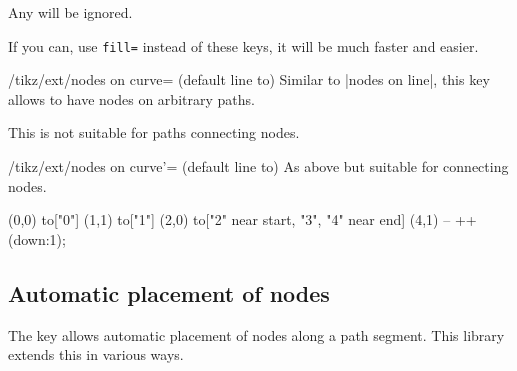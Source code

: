 \begin{multicols}{2}
Any  will be ignored.

If you can, use \texttt{fill=}
instead of these keys, it will be much faster and easier.

\begin{stylekey}{/tikz/ext/nodes on curve= (default line to)}
Similar to |nodes on line|, this key allows
to have nodes on arbitrary paths.

This is not suitable for paths connecting nodes.
\end{stylekey}

\begin{stylekey}{/tikz/ext/nodes on curve'= (default line to)}
As above but suitable for connecting nodes.
\end{stylekey}

\begin{codeexample}[preamble=\usetikzlibrary{ext.nodes, intersections, quotes, spath3}]
\end{codeexample}
\begin{codeexample}[preamble=\usetikzlibrary{ext.nodes, intersections, quotes, spath3}]
\tikz[inner sep=.15em, circle, nodes={draw, green}, sloped, ultra thick]
  \draw[->, ext/nodes on curve=bend left] (0,0) to["0"] (1,1)
                                                to["1"] (2,0)
                  to["2" near start, "3", "4" near end] (4,1)
                                                -- ++(down:1);
\end{codeexample}

\newcolumn
\subsection{Automatic placement of nodes}
The  key allows automatic placement of
nodes along a path segment.
This library extends this in various ways.


\end{multicols}
